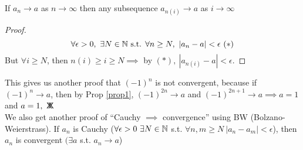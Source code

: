 \begin{proposition}\label{prop1}
If $a_n \to a$ as $n\to \infty$ then any subsequence $a_{n(i)} \to a$ as $i \to \infty$	
\end{proposition}

\begin{proof}
\[\forall \epsilon >0,~\exists N \in\mathbb{N} \text{ s.t. } \forall n \geq N,~|a_n - a| < \epsilon ~(*)\]	
But $\forall i \geq N$, then $n(i) \geq i \geq N \implies$ by $(*),~|a_{n(i)} - a| < \epsilon$.
\end{proof}

This gives us another proof that $(-1)^n$ is not convergent, because if $(-1)^n \to a$, then by Prop \ref{prop1}, $(-1)^{2n} \to a$ and $(-1)^{2n+1} \to a \implies a = 1$ and $a = 1,~\mathsf{X}\mkern-8.5mu\mathsf{X}$\\

We also get another proof of ``Cauchy $\implies$ convergence'' using BW (Bolzano-Weierstrass). If $a_n$ is Cauchy ($\forall \epsilon >0 ~\exists N \in\mathbb{N}$ s.t. $\forall n,m \geq N~|a_n -a_m | < \epsilon$), then $a_n$ is convergent $(\exists a$ s.t. $a_n \to a$)


